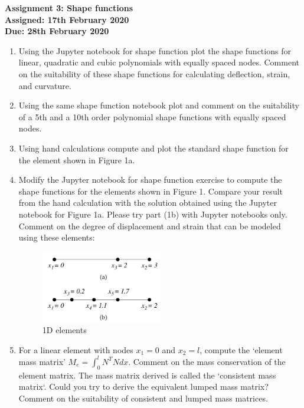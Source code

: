 \documentclass[a4paper,12pt]{article}
\begin{document}
\begin{centering}
	\textbf{
		Assignment 3: Shape functions\\
		Assigned: 17th February 2020\\
		Due: 28th February 2020\\
	}
\end{centering}

\vspace{1em}
 
\begin{enumerate}

	\item Using the Jupyter notebook for shape function plot the shape functions for linear, quadratic and cubic polynomials with equally spaced nodes. Comment on the suitability of these shape functions for calculating deflection, strain, and curvature.
	
	\item Using the same shape function notebook plot and comment on the suitability of a 5th and a 10th order polynomial shape functions with equally spaced nodes.

	\item Using hand calculations compute and plot the standard shape function for the element shown in Figure 1a.
	
	\item Modify the Jupyter notebook for shape function exercise to compute the shape functions for the elements shown in Figure 1. Compare your result from the  hand calculation with the solution obtained using the Jupyter notebook for Figure 1a. Please try part (1b) with Jupyter notebooks only. Comment on the degree of displacement and strain that can be modeled using these elements:
	\begin{figure}[!h]
		\centering
		\includegraphics[width=0.5\textwidth]{figs/shapefns.png}
		\caption{1D elements}
	\end{figure}

	\item For a linear element with nodes $x_1 = 0$ and $x_2 = l$, compute the `element mass matrix' $M_e = \int_0^l N^T N dx$. Comment on the mass conservation of the element matrix. The mass matrix derived is called the `consistent mass matrix`. Could you try to derive the equivalent lumped mass matrix? Comment on the suitability of consistent and lumped mass matrices.
	
\end{enumerate}
\end{document}
